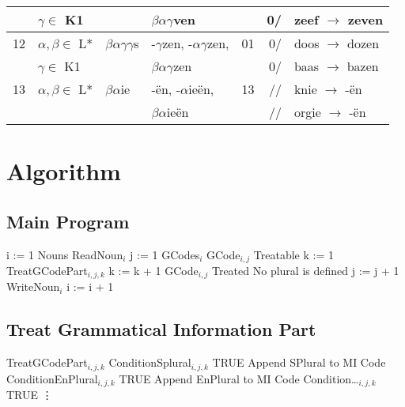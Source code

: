 \begin{tabular}{|r|l|l|l|r|r|l|}
     & $\gamma \in$ K1
       &
         & $\beta\alpha\gamma$ven
           & 
             & 0/
               & zeef $\rightarrow$ zeven \\ \hline
  12 & $\alpha,\beta \in$ L*
       & $\beta\alpha\gamma\gamma$s
         & -$\gamma$zen, -$\alpha\gamma$zen, 
           & 01
             & 0/
               & doos $\rightarrow$ dozen \\
     & $\gamma \in$ K1
       &
         & $\beta\alpha\gamma$zen
           & 
             & 0/
               & baas $\rightarrow$ bazen \\ \hline
  13 & $\alpha,\beta \in$ L*
       & $\beta\alpha$ie
         & -\"{e}n, -$\alpha$ie\"{e}n,
           & 13
             & //
               & knie $\rightarrow$ -\"{e}n\\ 
     &
       &
         & $\beta\alpha$ie\"{e}n
           & 
             & //
               & orgie $\rightarrow$ -\"{e}n \\ \hline
\end{tabular}

\newpage
\section{Algorithm}

\subsection{Main Program}

 i := 1
    Nouns 
   ReadNoun$_i$
   j := 1
     GCodes$_i$ 
     GCode$_{i,j}$  Treatable 
     k := 1
     
      TreatGCodePart$_{i,j,k}$
      k := k + 1
     GCode$_{i,j}$  Treated
   
     No plural is defined
    
    j := j + 1
   
   WriteNoun$_i$
   i := i + 1
  

\subsection{Treat Grammatical Information Part}

  TreatGCodePart$_{i,j,k}$ 
  
    ConditionSplural$_{i,j,k}$  TRUE 
    Append SPlural to MI Code 
   ConditionEnPlural$_{i,j,k}$  TRUE 
    Append EnPlural to MI Code 
   Condition\ldots$_{i,j,k}$  TRUE 
    \vdots
{}  
   

